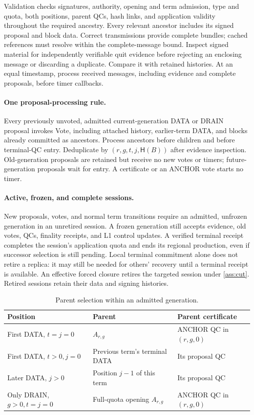 \documentclass[11pt,a4paper]{article}
\newcommand{\Hash}{\mathsf H}
\begin{document}
Validation checks signatures, authority, opening and term admission,
type and quota, both positions, parent QCs, hash links, and application
validity throughout the required ancestry. Every relevant ancestor includes
its signed proposal and block data. Correct transmissions provide complete
bundles; cached references must resolve within the complete-message bound.
Inspect signed material for independently verifiable quit evidence before
rejecting an enclosing message or discarding a duplicate. Compare it with
retained histories. At an equal timestamp, process received messages,
including evidence and complete proposals, before timer callbacks.

\paragraph{One proposal-processing rule.}
Every previously unvoted, admitted current-generation DATA or DRAIN
proposal invokes Vote, including attached history, earlier-term DATA,
and blocks already committed as ancestors. Process ancestors before
children and before terminal-QC entry. Deduplicate by
$(r,g,t,j,\Hash(B))$ after evidence inspection. Old-generation proposals
are retained but receive no new votes or timers; future-generation
proposals wait for entry. A certificate or an ANCHOR vote starts no timer.

\paragraph{Active, frozen, and complete sessions.}
New proposals, votes, and normal term transitions require an admitted,
unfrozen generation in an unretired session. A frozen generation still
accepts evidence, old votes, QCs, finality receipts, and L1 control updates.
A verified terminal receipt completes the session's application quota and
ends its regional production, even if successor selection is still pending.
Local terminal commitment alone does not retire a replica: it may still be
needed for others' recovery until a terminal receipt is available.
An effective forced closure retires the targeted session under
\cref{ass:cut}. Retired sessions retain their data and signing histories.

\begin{table}[htbp]\centering\small
\caption{Parent selection within an admitted generation.}
\label{tab:parent}
\begin{tabularx}{\linewidth}{@{}p{.32\linewidth}Y Y@{}}
\toprule
Position & Parent & Parent certificate\\
\midrule
First DATA, $t=j=0$ & $A_{r,g}$ & ANCHOR QC in $(r,g,0)$\\
First DATA, $t>0,j=0$ & Previous term's terminal DATA & Its proposal QC\\
Later DATA, $j>0$ & Position $j-1$ of this term & Its proposal QC\\
Only DRAIN, $g>0,t=j=0$ & Full-quota opening $A_{r,g}$ & ANCHOR QC in $(r,g,0)$\\
\bottomrule
\end{tabularx}
\end{table}
\end{document}
